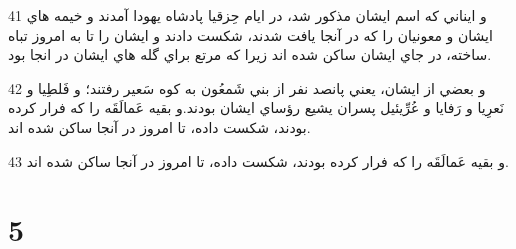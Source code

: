 \par 41 و ايناني که اسم ايشان مذکور شد، در ايام حِزقيا پادشاه يهودا آمدند و خيمه هاي ايشان و معونيان را که در آنجا يافت شدند، شکست دادند و ايشان را تا به امروز تباه ساخته، در جاي ايشان ساکن شده اند زيرا که مرتع براي گله هاي ايشان در انجا بود.
\par 42 و بعضي از ايشان، يعني پانصد نفر از بني شَمعُون به کوه سَعير رفتند؛ و فَلطِيا و نَعرِيا و رَفايا و عُرِّيئيل پسران يشيع رؤساي ايشان بودند.و بقيه عَمالَقَه را که فرار کرده بودند، شکست داده، تا امروز در آنجا ساکن شده اند.
\par 43 و بقيه عَمالَقَه را که فرار کرده بودند، شکست داده، تا امروز در آنجا ساکن شده اند.
 
\chapter{5}

